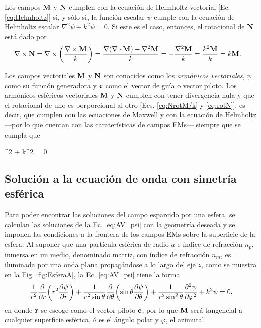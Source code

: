 Los campos $\vb{M}$ y $\vb{N}$ cumplen con la  ecuación de Helmholtz vectorial [Ec. \eqref{eq:Helmholtz}] si, y sólo si, la función escalar $\psi$ cumple con la ecuación de Helmholtz escalar $\nabla^2 \psi + k^2 \psi = 0$. Si este es el caso, entonces, el rotacional de $\vb{N}$ está dado por
	\begin{align}
	\nabla\times \vb{N} &= \nabla\times \qty(\frac{\nabla\times \vb{M}}{k})  
						= \frac{\nabla\qty(\nabla\cdot\vb{M})-\nabla^2\vb{M}}{k}
						= - \frac{\nabla^2 \vb{M}}{k}
						= \frac{k^2 \vb{M}}{k}
						= k \vb{M}.\label{eq:rotN}
	\end{align}
	
Los campos vectoriales $\vb{M}$ y $\vb{N}$ son conocidos como los \emph{armónicos  vectoriales}, $\psi$ como su función generadora y $\vb{c}$ como el vector de guía o vector piloto. Los armónicos esféricos vectoriales $\vb{M}$ y $\vb{N}$  cumplen con tener divergencia nula y que el rotacional de uno es porporcional al otro [Ecs. \eqref{eq:NrotM/k} y \eqref{eq:rotN}], es decir, que cumplen con las ecuaciones de Maxwell y con la ecuación de Helmholtz ---por lo que cuentan con las caraterísticas de campos EMs--- siempre que se cumpla que \vspace*{-.5em}
	\begin{tcolorbox}[title = $\mathbf{\psi}$: Función generadora de los armónicos  vectoriales, ams align ]
	\nabla^2 \psi + k^2 \psi  = 0.\label{eq:AV_psi}
	\end{tcolorbox}

	\subsection{Solución a la ecuación de onda con simetría esférica}

Para poder encontrar las soluciones del campo esparcido por una esfera, se calculan  las soluciones de la Ec. \eqref{eq:AV_psi} con la geometría deseada y se imponen las condiciones a la frontera de los campos EMs sobre la superficie de la esfera. Al suponer que una partícula esférica de radio $a$ e índice de refracción $n_p$, inmersa en un medio, denominado matriz, con índice de refracción $n_m$, es iluminada por una onda plana propagándose a lo largo del eje $z$, como se muestra en la Fig. \ref{fig:EsferaA}, la Ec. \eqref{eq:AV_psi} tiene la forma
	\begin{equation}
	\frac{1}{r^2} \pdv{r}\qty(r^2\pdv{\psi}{r})+ 
	\frac{1}{r^2\sin\theta}\pdv{\theta}\qty(\sin\theta\pdv{\psi}{\theta})
	 + \frac{1}{r^2\sin^2\theta}\pdv[2]{\psi}{\varphi} + k^2 \psi =0, \label{eq:AEV_psi}
	\end{equation}
en donde $\vb{r}$ se escoge como el vector piloto $\vb{c}$, por lo que $\vb{M}$ será tangencial a cualquier superficie esférica, $\theta$ es el ángulo polar y $\varphi$, el azimutal.

